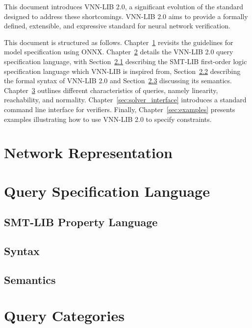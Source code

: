 \documentclass[12pt,a4paper]{report}
\begin{document}
This document introduces VNN-LIB 2.0, a significant evolution of the standard designed to address these shortcomings. VNN-LIB 2.0 aims 
to provide a formally defined, extensible, and expressive standard for neural network verification.

This document is structured as follows. Chapter~\ref{sec:model} revisits the guidelines for model specification using ONNX.\@
Chapter~\ref{sec:specification_language} details the VNN-LIB 2.0 query specification language, with Section~\ref{sec:smtlib} describing the 
SMT-LIB first-order logic specification language which VNN-LIB is inspired from, Section~\ref{sec:syntax} describing the formal syntax of VNN-LIB 2.0 and 
Section~\ref{sec:semantics} discussing its semantics. Chapter~\ref{sec:query_categories} outlines different characteristics of queries, namely linearity, 
reachability, and normality. Chapter~\ref{sec:solver_interface} introduces a standard command  line interface for verifiers. Finally, Chapter~\ref{sec:examples} 
presents examples illustrating how to use VNN-LIB 2.0 to specify constraints.

\chapter{Network Representation}\label{sec:model}


\chapter{Query Specification Language}\label{sec:specification_language}

\section{SMT-LIB Property Language}\label{sec:smtlib}


\section{Syntax}\label{sec:syntax}


\section{Semantics}\label{sec:semantics}


\chapter{Query Categories}\label{sec:query_categories}
\end{document}

